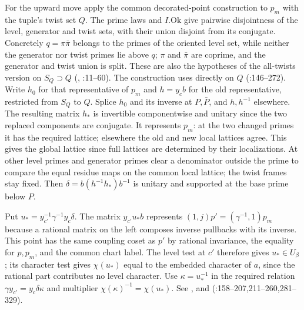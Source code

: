 For the upward move apply the common decorated-point construction to
$p_m$ with the tuple's twist set $Q$. The prime laws and $I.\mathrm{Ok}$
give pairwise disjointness of the level, generator and twist sets,
with their union disjoint from its conjugate. Concretely $q=\pi\bar\pi$
belongs to the primes of the oriented level set, while neither the
generator nor twist primes lie above $q$; $\pi$ and $\bar\pi$ are
coprime, and the generator and twist union is split. These are also
the hypotheses of the all-twists version on $S_Q\supset Q$
(,
:11--60).
The construction  uses  directly
on $Q$ (:146--272).
Write $h_0$ for that representative of $p_m$ and $h=y_c b$ for
the old representative, restricted from $S_Q$ to $Q$.
Splice $h_0$ and its inverse at $P,\bar P$, and $h,h^{-1}$ elsewhere.
The resulting matrix $h_*$ is invertible componentwise and unitary
since the two replaced components are conjugate. It represents $p_m$:
at the two changed primes it has the required lattice; elsewhere
the old and new local lattices agree. This gives the global lattice
since full lattices are determined by their localizations. At other
level primes and generator primes clear a denominator outside the
prime to compare the equal residue maps on the common local lattice;
the twist frames stay fixed. Then $\delta=b(h^{-1}h_*)b^{-1}$ is
unitary and supported at the base prime below $P$.

Put $u_*=y_{c'}^{-1}\gamma^{-1}y_c\delta$. The matrix $y_{c'}u_*b$
represents $(1,j)p'= (\gamma^{-1},1)p_m$ because a rational matrix
on the left composes inverse pullbacks with its inverse. This point
has the same coupling coset as $p'$ by rational invariance,
the equality for $p,p_m$, and the common chart label. The level test
at $c'$ therefore gives $u_*\in U_\beta$; its character test gives
$\chi(u_*)$ equal to the embedded character of $a$, since the rational
part contributes no level character. Use $\kappa=u_*^{-1}$ in the
required relation $\gamma y_{c'}=y_c\delta\kappa$ and multiplier
$\chi(\kappa)^{-1}=\chi(u_*)$. See , 
and  (:158--207,211--260,281--329).


